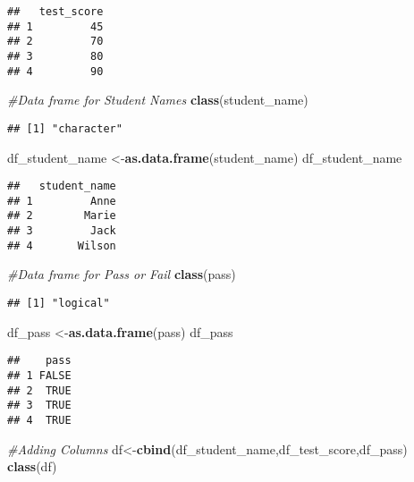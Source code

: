 \documentclass[
]{article}
\newenvironment{Shaded}{\begin{snugshade}}{\end{snugshade}}
\newcommand{\CommentTok}[1]{\textcolor[rgb]{0.56,0.35,0.01}{\textit{#1}}}
\newcommand{\FunctionTok}[1]{\textcolor[rgb]{0.13,0.29,0.53}{\textbf{#1}}}
\newcommand{\NormalTok}[1]{#1}
\newcommand{\OtherTok}[1]{\textcolor[rgb]{0.56,0.35,0.01}{#1}}
\begin{document}
\begin{verbatim}
##   test_score
## 1         45
## 2         70
## 3         80
## 4         90
\end{verbatim}

\begin{Shaded}
\begin{Highlighting}[]
\CommentTok{\#Data frame for Student Names}
\FunctionTok{class}\NormalTok{(student\_name)}
\end{Highlighting}
\end{Shaded}

\begin{verbatim}
## [1] "character"
\end{verbatim}

\begin{Shaded}
\begin{Highlighting}[]
\NormalTok{df\_student\_name }\OtherTok{\textless{}{-}}\FunctionTok{as.data.frame}\NormalTok{(student\_name)}
\NormalTok{df\_student\_name}
\end{Highlighting}
\end{Shaded}

\begin{verbatim}
##   student_name
## 1         Anne
## 2        Marie
## 3         Jack
## 4       Wilson
\end{verbatim}

\begin{Shaded}
\begin{Highlighting}[]
\CommentTok{\#Data frame for \textquotesingle{}Pass or Fail\textquotesingle{}}
\FunctionTok{class}\NormalTok{(pass)}
\end{Highlighting}
\end{Shaded}

\begin{verbatim}
## [1] "logical"
\end{verbatim}

\begin{Shaded}
\begin{Highlighting}[]
\NormalTok{df\_pass }\OtherTok{\textless{}{-}}\FunctionTok{as.data.frame}\NormalTok{(pass)}
\NormalTok{df\_pass}
\end{Highlighting}
\end{Shaded}

\begin{verbatim}
##    pass
## 1 FALSE
## 2  TRUE
## 3  TRUE
## 4  TRUE
\end{verbatim}

\begin{Shaded}
\begin{Highlighting}[]
\CommentTok{\#Adding Columns }
\NormalTok{df}\OtherTok{\textless{}{-}}\FunctionTok{cbind}\NormalTok{(df\_student\_name,df\_test\_score,df\_pass)}
\FunctionTok{class}\NormalTok{(df)}
\end{Highlighting}
\end{Shaded}
\end{document}
